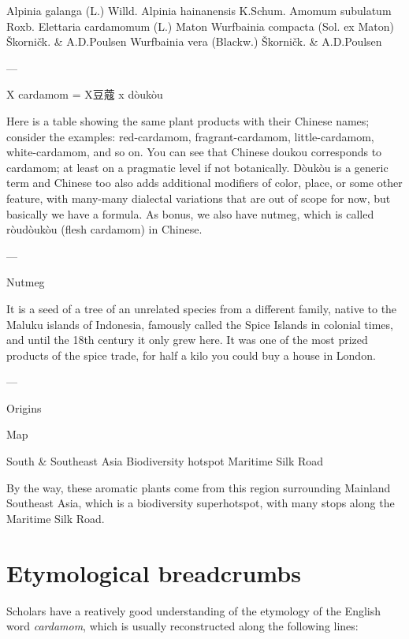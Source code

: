 \documentclass[12pt]{article}
\begin{document}
Alpinia galanga (L.) Willd. 
Alpinia hainanensis K.Schum.	
Amomum subulatum Roxb.	
Elettaria cardamomum (L.) Maton 
Wurfbainia compacta (Sol. ex Maton) Škorničk. \& A.D.Poulsen
Wurfbainia vera (Blackw.) Škorničk. \& A.D.Poulsen

---

X cardamom  = X豆蔻 x dòukòu



Here is a table showing the same plant products with their Chinese names; consider the examples: red-cardamom, fragrant-cardamom, little-cardamom, white-cardamom, and so on.
You can see that Chinese doukou corresponds to cardamom; at least on a pragmatic level if not botanically. 
Dòukòu is a generic term and Chinese too also adds additional modifiers of color, place, or some other feature, with many-many dialectal variations that are out of scope for now, but basically we have a formula.
As bonus, we also have nutmeg, which is called ròudòukòu (flesh cardamom) in Chinese.

---

Nutmeg

It is a seed of a tree of an unrelated species from a different family, native to the Maluku islands of Indonesia, famously called the Spice Islands in colonial times, and until the 18th century it only grew here. It was one of the most prized products of the spice trade, for half a kilo you could buy a house in London. 


---

Origins

Map

South \& Southeast Asia
Biodiversity hotspot
Maritime Silk Road

By the way, these aromatic plants come from this region surrounding Mainland Southeast Asia, which is a biodiversity superhotspot, with many stops along the Maritime Silk Road.









\section{Etymological breadcrumbs}\label{sec:etymology}

Scholars have a reatively good understanding of the etymology of the English word \textit{cardamom}, which is usually reconstructed along the following lines:
\end{document}
